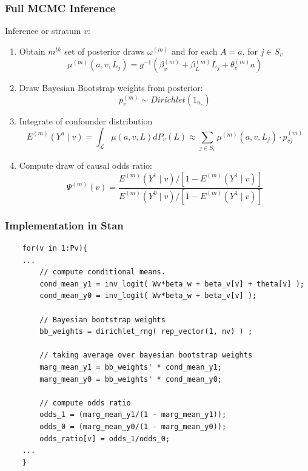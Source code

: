 \documentclass[xcolor=x11names,compress]{beamer}
\renewcommand{\(}{\begin{columns}}
\renewcommand{\)}{\end{columns}}
\newcommand{\<}[1]{\begin{column}{#1}}
\renewcommand{\>}{\end{column}}
\begin{document}
\begin{frame}
	\frametitle{Full MCMC Inference}
	Inference or stratum $v$:
	\begin{enumerate}
	\scriptsize
		\item Obtain $m^{th}$ set of posterior draws $\omega^{(m)}$ and for each $A=a$, for $j \in S_v$
		$$  \mu^{(m)}( a, v, L_j ) = g^{-1}( \beta_v^{(m)} + \beta_L^{(m)}L_j + \theta_v^{(m)} a) $$
		
		\pause
		\item Draw Bayesian Bootstrap weights from posterior:
		$$ p_v^{(m)} \sim Dirichlet(1_{n_v}) $$
		
		\pause
		\item Integrate of confounder distribution
		$$ E^{(m)}(Y^a \mid v ) = \int_{\mathcal{L}} \mu(a, v, L) dP_v (L) \approx \sum_{j \in S_v} \mu^{(m)}( a, v, L_j ) \cdot p_{vj}^{(m)} $$
		
		\pause
		\item Compute draw of causal odds ratio:
		$$ \Psi^{(m)} (v) = \frac{ E^{(m)}(Y^1 \mid v)/[1-E^{(m)}(Y^1 \mid v)] }{E^{(m)}(Y^0 \mid v)/[1-E^{(m)}(Y^1 \mid v)] } $$
	\end{enumerate}
\end{frame}

\begin{frame}[fragile]
	\frametitle{Implementation in Stan}
	\scriptsize
	\begin{verbatim}
	for(v in 1:Pv){
	...	
	    // compute conditional means.
	    cond_mean_y1 = inv_logit( Wv*beta_w + beta_v[v] + theta[v] );
	    cond_mean_y0 = inv_logit( Wv*beta_w + beta_v[v] );
    
	    // Bayesian bootstrap weights
	    bb_weights = dirichlet_rng( rep_vector(1, nv) ) ;
    
	    // taking average over bayesian bootstrap weights
	    marg_mean_y1 = bb_weights' * cond_mean_y1;
	    marg_mean_y0 = bb_weights' * cond_mean_y0;
    
	    // compute odds ratio 
	    odds_1 = (marg_mean_y1/(1 - marg_mean_y1));
	    odds_0 = (marg_mean_y0/(1 - marg_mean_y0));
	    odds_ratio[v] = odds_1/odds_0;
	...
	}
	
	\end{verbatim}
\end{frame}
\end{document}
